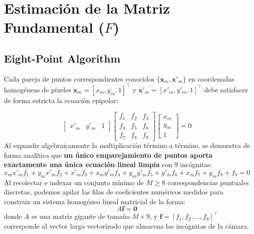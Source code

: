 \section{Estimación de la Matriz Fundamental ($F$)}

\subsection{Eight-Point Algorithm}
\noindent
Cada pareja de puntos correspondientes conocidos $\{\mathbf{x}_m, \mathbf{x}'_m\}$ en coordenadas homogéneas de píxeles $\mathbf{x}_m = [x_m, y_m, 1]^{\top}$ y $\mathbf{x}'_m = [x'_m, y'_m, 1]^{\top}$ debe satisfacer de forma estricta la ecuación epipolar:

\begin{equation*}
    \begin{bmatrix} x'_m & y'_m & 1 \end{bmatrix} 
    \begin{bmatrix} f_1 & f_2 & f_3 \\ f_4 & f_5 & f_6 \\ f_7 & f_8 & f_9 \end{bmatrix}
    \begin{bmatrix} x_m \\ y_m \\ 1 \end{bmatrix} = 0 
\end{equation*}
Al expandir algebraicamente la multiplicación término a término, se demuestra de forma analítica que \textbf{un único emparejamiento de puntos aporta exactamente una única ecuación lineal limpia} con 9 incógnitas:
\begin{equation*}
    x_m x'_m f_1 + y_m x'_m f_2 + x'_m f_3 + x_m y'_m f_4 + y_m y'_m f_5 + y'_m f_6 + x_m f_7 + y_m f_8 + f_9 = 0
\end{equation*}
Al recolectar e indexar un conjunto mínimo de $M \ge 8$ correspondencias puntuales discretas, podemos apilar las filas de coeficientes numéricos medidos para construir un sistema homogéneo lineal matricial de la forma:
\begin{equation*}
    A \mathbf{f} = \mathbf{0} 
\end{equation*}
donde $A$ es una matriz gigante de tamaño $M \times 9$, y $\mathbf{f} = [f_1, f_2, \dots, f_9]^{\top}$ corresponde al vector largo vectorizado que almacena las incógnitas de la cámara.

